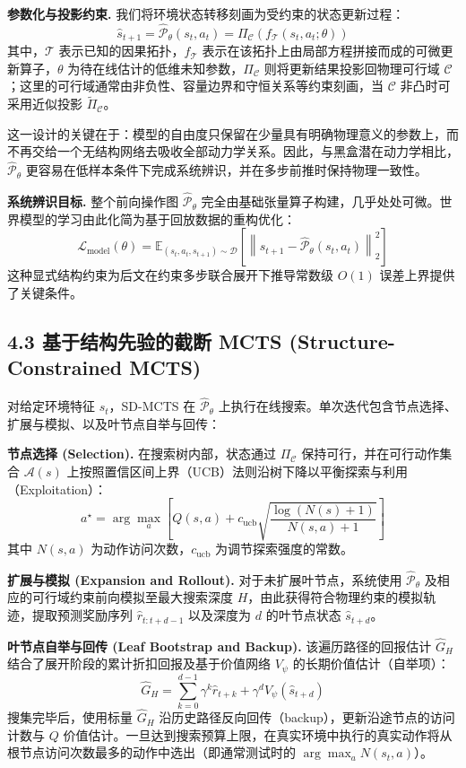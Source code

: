 \documentclass[UTF8]{ctexart}
\begin{document}
\textbf{参数化与投影约束.}
我们将环境状态转移刻画为受约束的状态更新过程：
\[
\hat s_{t+1}= \hat{\mathcal P}_\theta(s_t,a_t) = \Pi_{\mathcal C}\!\left(f_{\mathcal T}(s_t,a_t;\theta)\right)
\]
其中，\(\mathcal T\) 表示已知的因果拓扑，\(f_{\mathcal T}\) 表示在该拓扑上由局部方程拼接而成的可微更新算子，\(\theta\) 为待在线估计的低维未知参数，\(\Pi_{\mathcal C}\) 则将更新结果投影回物理可行域 \(\mathcal C\)；这里的可行域通常由非负性、容量边界和守恒关系等约束刻画，当 \(\mathcal C\) 非凸时可采用近似投影 \(\tilde{\Pi}_{\mathcal C}\)。

这一设计的关键在于：模型的自由度只保留在少量具有明确物理意义的参数上，而不再交给一个无结构网络去吸收全部动力学关系。因此，与黑盒潜在动力学相比，\(\hat{\mathcal P}_\theta\) 更容易在低样本条件下完成系统辨识，并在多步前推时保持物理一致性。

\textbf{系统辨识目标.}
整个前向操作图 $\hat{\mathcal P}_\theta$ 完全由基础张量算子构建，几乎处处可微。世界模型的学习由此化简为基于回放数据的重构优化：
\[
\mathcal L_{\text{model}}(\theta)= \mathbb E_{(s_t,a_t,s_{t+1})\sim\mathcal D} \left[ \left\| s_{t+1}- \hat{\mathcal P}_\theta(s_t,a_t)\right\|_2^2 \right]
\]
这种显式结构约束为后文在约束多步联合展开下推导常数级 $O(1)$ 误差上界提供了关键条件。

\hypertarget{sub-mcts}{%
\subsection{4.3 基于结构先验的截断 MCTS (Structure-Constrained MCTS)}\label{sub-mcts}}

对给定环境特征 $s_t$，SD-MCTS 在 $\hat{\mathcal P}_\theta$ 上执行在线搜索。单次迭代包含节点选择、扩展与模拟、以及叶节点自举与回传：

\textbf{节点选择 (Selection).}
在搜索树内部，状态通过 \(\Pi_{\mathcal C}\) 保持可行，并在可行动作集合 \(\mathcal A(s)\) 上按照置信区间上界（UCB）法则沿树下降以平衡探索与利用（Exploitation）：
\[
a^\star = \arg\max_a \left[ Q(s,a) + c_{\text{ucb}} \sqrt{\frac{\log(N(s)+1)}{N(s,a)+1}} \right]
\]
其中 $N(s,a)$ 为动作访问次数，$c_{\text{ucb}}$ 为调节探索强度的常数。

\textbf{扩展与模拟 (Expansion and Rollout).}
对于未扩展叶节点，系统使用 $\hat{\mathcal P}_\theta$ 及相应的可行域约束前向模拟至最大搜索深度 $H$，由此获得符合物理约束的模拟轨迹，提取预测奖励序列 $\hat{r}_{t:t+d-1}$ 以及深度为 $d$ 的叶节点状态 $\hat{s}_{t+d}$。

\textbf{叶节点自举与回传 (Leaf Bootstrap and Backup).}
该遍历路径的回报估计 $\hat{G}_H$ 结合了展开阶段的累计折扣回报及基于价值网络 $V_\psi$ 的长期价值估计（自举项）：
\[
\hat G_H = \sum_{k=0}^{d-1}\gamma^k \hat r_{t+k} +\gamma^d V_\psi(\hat s_{t+d})
\]
搜集完毕后，使用标量 $\hat{G}_H$ 沿历史路径反向回传（backup），更新沿途节点的访问计数与 $Q$ 价值估计。一旦达到搜索预算上限，在真实环境中执行的真实动作将从根节点访问次数最多的动作中选出（即通常测试时的 $\arg\max_a N(s_t,a)$）。
\end{document}
